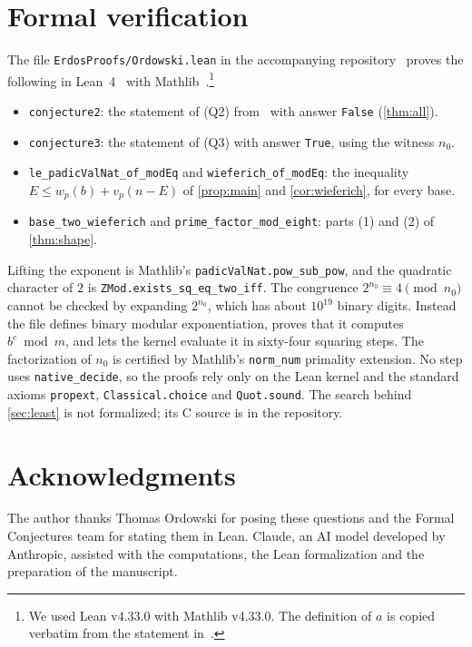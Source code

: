 \documentclass[11pt]{amsart}
\theoremstyle{remark}
\newcommand{\vp}{v_p}
\newcommand{\nO}{n_0}
\begin{document}
\section{Formal verification}\label{sec:lean}

The file \texttt{ErdosProofs/Ordowski.lean} in the accompanying repository~\cite{repo}
proves the following in Lean~4~\cite{lean4} with Mathlib~\cite{mathlib}.\footnote{We
used Lean v4.33.0 with Mathlib v4.33.0. The definition of $a$ is copied verbatim from the
statement in~\cite{formalconj}.}

\begin{itemize}
\item \texttt{conjecture2}: the statement of (Q2) from~\cite{formalconj} with answer
\texttt{False} (\cref{thm:all}).
\item \texttt{conjecture3}: the statement of (Q3) with answer \texttt{True}, using the witness
$\nO$.
\item \texttt{le\_padicValNat\_of\_modEq} and \texttt{wieferich\_of\_modEq}: the inequality
$E\le w_p(b)+\vp(n-E)$ of \cref{prop:main} and \cref{cor:wieferich}, for every base.
\item \texttt{base\_two\_wieferich} and \texttt{prime\_factor\_mod\_eight}: parts (1) and
(2) of \cref{thm:shape}.
\end{itemize}

Lifting the exponent is Mathlib's \texttt{padicValNat.pow\_sub\_pow}, and the quadratic
character of $2$ is \texttt{ZMod.exists\_sq\_eq\_two\_iff}. The congruence
$2^{\nO}\equiv4\pmod{\nO}$ cannot be checked by expanding $2^{\nO}$, which has about
$10^{19}$ binary digits. Instead the file defines binary modular exponentiation, proves that
it computes $b^{e}\bmod m$, and lets the kernel evaluate it in sixty-four squaring steps. The
factorization of $\nO$ is certified by Mathlib's \texttt{norm\_num} primality extension. No
step uses \texttt{native\_decide}, so the proofs rely only on the Lean kernel and the
standard axioms \texttt{propext}, \texttt{Classical.choice} and \texttt{Quot.sound}. The
search behind \cref{sec:least} is not formalized; its C source is in the repository.

\section*{Acknowledgments}
The author thanks Thomas Ordowski for posing these questions and the Formal Conjectures
team for stating them in Lean. Claude, an AI model developed by Anthropic, assisted with
the computations, the Lean formalization and the preparation of the manuscript.
\end{document}
